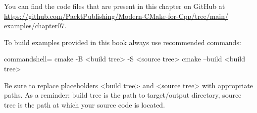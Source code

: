You can find the code files that are present in this chapter on GitHub at \url{https://github.com/PacktPublishing/Modern-CMake-for-Cpp/tree/main/ examples/chapter07}.

To build examples provided in this book always use recommended commands:

\begin{tcblisting}{commandshell={}}
cmake -B <build tree> -S <source tree>
cmake --build <build tree>
\end{tcblisting}

Be sure to replace placeholders <build tree> and <source tree> with appropriate paths. As a reminder: build tree is the path to target/output directory, source tree is the path at which your source code is located.